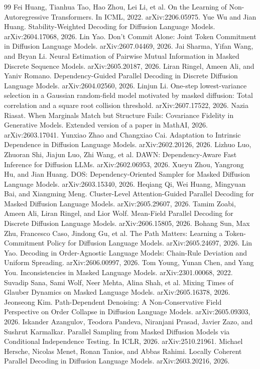 \begin{thebibliography}{99}
 Fei Huang, Tianhua Tao, Hao Zhou, Lei Li, et al. On the Learning of Non-Autoregressive Transformers. In ICML, 2022. arXiv:2206.05975.
 Yue Wu and Jian Huang. Stability-Weighted Decoding for Diffusion Language Models. arXiv:2604.17068, 2026.
 Lin Yao. Don't Commit Alone: Joint Token Commitment in Diffusion Language Models. arXiv:2607.04469, 2026.
 Jai Sharma, Yifan Wang, and Bryan Li. Neural Estimation of Pairwise Mutual Information in Masked Discrete Sequence Models. arXiv:2605.20187, 2026.
 Liran Ringel, Ameen Ali, and Yaniv Romano. Dependency-Guided Parallel Decoding in Discrete Diffusion Language Models. arXiv:2604.02560, 2026.
 Linjun Li. One-step lowest-variance selection in a Gaussian random-field model motivated by masked diffusion: Total correlation and a square root collision threshold. arXiv:2607.17522, 2026.
 Nazia Riasat. When Marginals Match but Structure Fails: Covariance Fidelity in Generative Models. Extended version of a paper in MathAI, 2026. arXiv:2603.17041.
 Yunxiao Zhao and Changxiao Cai. Adaptation to Intrinsic Dependence in Diffusion Language Models. arXiv:2602.20126, 2026.
 Lizhuo Luo, Zhuoran Shi, Jiajun Luo, Zhi Wang, et al. DAWN: Dependency-Aware Fast Inference for Diffusion LLMs. arXiv:2602.06953, 2026.
 Xueyu Zhou, Yangrong Hu, and Jian Huang. DOS: Dependency-Oriented Sampler for Masked Diffusion Language Models. arXiv:2603.15340, 2026.
 Heqiang Qi, Wei Huang, Mingyuan Bai, and Xiangming Meng. Cluster-Level Attention-Guided Parallel Decoding for Masked Diffusion Language Models. arXiv:2605.29607, 2026.
 Tamim Zoabi, Ameen Ali, Liran Ringel, and Lior Wolf. Mean-Field Parallel Decoding for Discrete Diffusion Language Models. arXiv:2606.15805, 2026.
 Bohang Sun, Max Zhu, Francesco Caso, Jindong Gu, et al. The Path Matters: Learning a Token-Commitment Policy for Diffusion Language Models. arXiv:2605.24697, 2026.
 Lin Yao. Decoding in Order-Agnostic Language Models: Chain-Rule Deviation and Uniform Spreading. arXiv:2606.00997, 2026.
 Tom Young, Yunan Chen, and Yang You. Inconsistencies in Masked Language Models. arXiv:2301.00068, 2022.
 Suvadip Sana, Sami Wolf, Neer Mehta, Alina Shah, et al. Mixing Times of Glauber Dynamics on Masked Language Models. arXiv:2605.16378, 2026.
 Jeonseong Kim. Path-Dependent Denoising: A Non-Conservative Field Perspective on Order Collapse in Diffusion Language Models. arXiv:2605.09303, 2026.
 Iskander Azangulov, Teodora Pandeva, Niranjani Prasad, Javier Zazo, and Sushrut Karmalkar. Parallel Sampling from Masked Diffusion Models via Conditional Independence Testing. In ICLR, 2026. arXiv:2510.21961.
 Michael Hersche, Nicolas Menet, Ronan Tanios, and Abbas Rahimi. Locally Coherent Parallel Decoding in Diffusion Language Models. arXiv:2603.20216, 2026.
\end{thebibliography}

